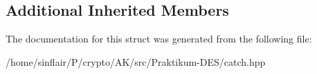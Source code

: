 \subsection*{Additional Inherited Members}


The documentation for this struct was generated from the following file\+:\begin{DoxyCompactItemize}
\item 
/home/sinflair/\+P/crypto/\+A\+K/src/\+Praktikum-\/\+D\+E\+S/catch.\+hpp\end{DoxyCompactItemize}
